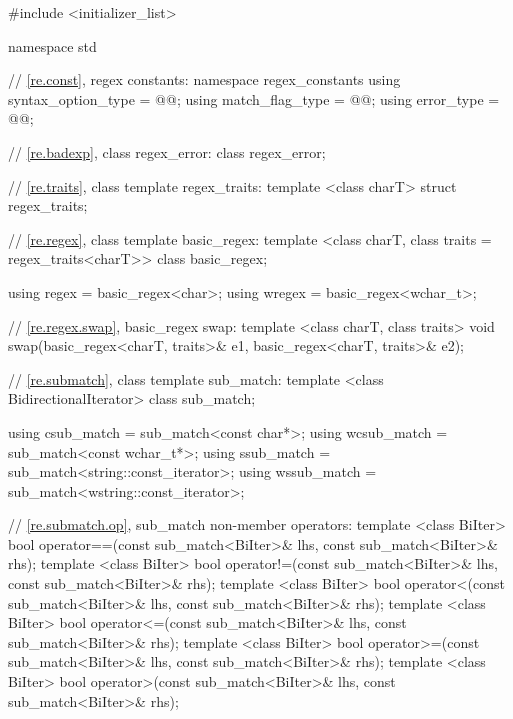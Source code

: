%
%
%
%
\begin{codeblock}
#include <initializer_list>

namespace std {
  // \ref{re.const}, regex constants:
  namespace regex_constants {
    using syntax_option_type = @@;
    using match_flag_type = @@;
    using error_type = @@;
  }

  // \ref{re.badexp}, class regex_error:
  class regex_error;

  // \ref{re.traits}, class template regex_traits:
  template <class charT> struct regex_traits;

  // \ref{re.regex}, class template basic_regex:
  template <class charT, class traits = regex_traits<charT>> class basic_regex;

  using regex  = basic_regex<char>;
  using wregex = basic_regex<wchar_t>;

  // \ref{re.regex.swap}, basic_regex swap:
  template <class charT, class traits>
    void swap(basic_regex<charT, traits>& e1, basic_regex<charT, traits>& e2);

  // \ref{re.submatch}, class template sub_match:
  template <class BidirectionalIterator> 
    class sub_match;

  using csub_match  = sub_match<const char*>;
  using wcsub_match = sub_match<const wchar_t*>;
  using ssub_match  = sub_match<string::const_iterator>;
  using wssub_match = sub_match<wstring::const_iterator>;

  // \ref{re.submatch.op}, sub_match non-member operators:
  template <class BiIter>
    bool operator==(const sub_match<BiIter>& lhs, const sub_match<BiIter>& rhs);
  template <class BiIter>
    bool operator!=(const sub_match<BiIter>& lhs, const sub_match<BiIter>& rhs);
  template <class BiIter>
    bool operator<(const sub_match<BiIter>& lhs, const sub_match<BiIter>& rhs);
  template <class BiIter>
    bool operator<=(const sub_match<BiIter>& lhs, const sub_match<BiIter>& rhs);
  template <class BiIter>
    bool operator>=(const sub_match<BiIter>& lhs, const sub_match<BiIter>& rhs);
  template <class BiIter>
    bool operator>(const sub_match<BiIter>& lhs, const sub_match<BiIter>& rhs);

}
\end{codeblock}
